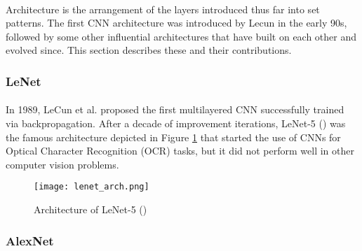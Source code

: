 \paragraph{}
Architecture is the arrangement of the layers introduced thus far into set patterns. The first \gls{CNN} architecture was introduced by Lecun in the early 90s, followed by some other influential architectures that have built on each other and evolved since. This section describes these and their contributions.

\subsubsection{LeNet}
\paragraph{}
In 1989, LeCun et al. proposed the first multilayered \gls{CNN} successfully trained via backpropagation. After a decade of improvement iterations, LeNet-5 (\cite{726791}) was the famous architecture depicted in Figure \ref{fig_lenet} that started the use of \gls{CNN}s for Optical Character Recognition (OCR) tasks, but it did not perform well in other computer vision problems.

    \begin{figure}[hbt!]
        \centering
        \texttt{[image: lenet\_arch.png]}
        \caption{Architecture of LeNet-5 (\cite{726791})}
        \label{fig_lenet}
    \end{figure}
    
\subsubsection{AlexNet}
